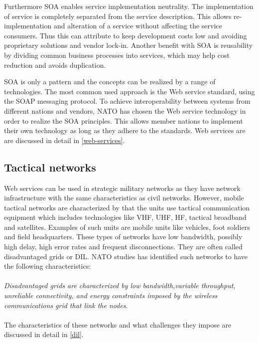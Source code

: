 \documentclass[USenglish]{ifimaster}
\begin{document}
Furthermore SOA enables service implementation neutrality. The implementation of service is completely separated from the service description. This allows re-implementation and alteration of a service without affecting the service consumers. Thus this can attribute to keep development costs low and avoiding proprietary solutions and vendor lock-in. Another benefit with SOA is reusability by dividing common business processes into services, which may help cost reduction and avoids duplication.

SOA is only a pattern and the concepts can be realized by a range of technologies. The most common used approach is the Web service standard, using the SOAP messaging protocol. To achieve interoperability between systems from different nations and vendors, NATO has chosen the Web service technology in order to realize the SOA principles. This allows member nations to implement their own technology as long as they adhere to the standards. Web services are are discussed in detail in \cref{web-services}.

\subsection{Tactical networks}
Web services can be used in strategic military networks as they have network infrastructure with the same characteristics as civil networks. However, mobile tactical networks are characterized by that the units use tactical communication equipment which includes technologies like VHF, UHF, HF, tactical broadband and satellites. Examples of such units are mobile units like vehicles, foot soldiers and field headquarters. These types of networks have low bandwidth, possibly high delay, high error rates and frequent disconnections. They are often called disadvantaged grids or DIL. NATO studies has identified such networks to have the following characteristics:

\paragraph{}
\textit{Disadvantaged grids are characterized by low bandwidth,variable throughput, unreliable connectivity, and energy constraints imposed by the wireless communications grid that link the nodes}\cite{nato-disadvantaged-grids}.

\paragraph{}
The characteristics of these networks and what challenges they impose are discussed in detail in \cref{dil}.
\end{document}

